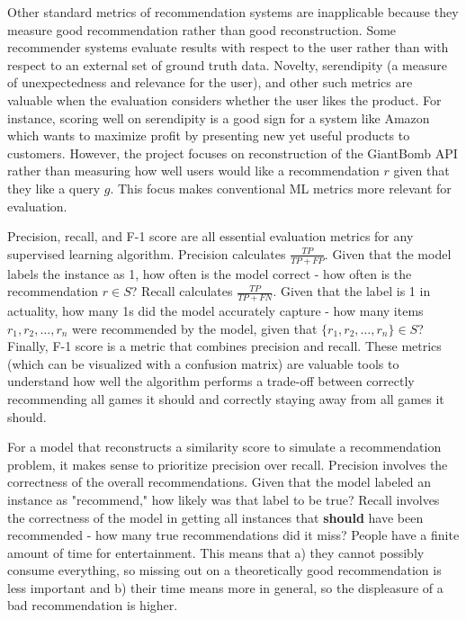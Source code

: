 \documentclass[10pt,twocolumn]{article}
\begin{document}
Other standard metrics of recommendation systems are inapplicable because they measure good recommendation rather than good reconstruction. Some recommender systems evaluate results with respect to the user rather than with respect to an external set of ground truth data. Novelty, serendipity (a measure of unexpectedness and relevance for the user), and other such metrics are valuable when the evaluation considers whether the user likes the product. \cite{Cremonesi} For instance, scoring well on serendipity is a good sign for a system like Amazon \cite{AmazonRS} which wants to maximize profit by presenting new yet useful products to customers. However, the project focuses on reconstruction of the GiantBomb API rather than measuring how well users would like a recommendation $r$ given that they like a query $g$. This focus makes conventional ML metrics more relevant for evaluation.

Precision, recall, and F-1 score are all essential evaluation metrics for any supervised learning algorithm. \cite{NAlAzzam, Chowdhury, Sujatha} Precision calculates $\frac{TP}{TP + FP}$. Given that the model labels the instance as 1, how often is the model correct - how often is the recommendation $r \in S$? Recall calculates $\frac{TP}{TP + FN}$. Given that the label is 1 in actuality, how many 1s did the model accurately capture - how many items $r_1, r_2, \dots, r_n$ were recommended by the model, given that $\{r_1, r_2, \dots, r_n\} \in S$? Finally, F-1 score is a metric that combines precision and recall. These metrics (which can be visualized with a confusion matrix) are valuable tools to understand how well the algorithm performs a trade-off between correctly recommending all games it should and correctly staying away from all games it should.

For a model that reconstructs a similarity score to simulate a recommendation problem, it makes sense to prioritize precision over recall. Precision involves the correctness of the overall recommendations. Given that the model labeled an instance as "recommend," how likely was that label to be true? Recall involves the correctness of the model in getting all instances that \textbf{should} have been recommended - how many true recommendations did it miss? People have a finite amount of time for entertainment. This means that a) they cannot possibly consume everything, so missing out on a theoretically good recommendation is less important and b) their time means more in general, so the displeasure of a bad recommendation is higher. 
\end{document}
